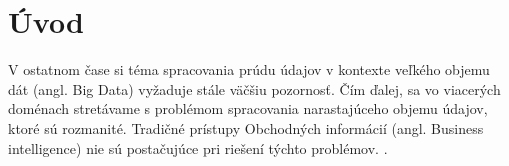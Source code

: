 %

\chapter{Úvod}
V ostatnom čase si téma spracovania prúdu údajov v kontexte veľkého objemu dát (angl. Big Data) vyžaduje stále väčšiu pozornosť. Čím ďalej, sa vo viacerých doménach stretávame s problémom spracovania narastajúceho objemu údajov, ktoré sú rozmanité. Tradičné prístupy Obchodných informácií (angl. Business intelligence) nie sú postačujúce pri riešení týchto problémov. \citep{liu2014survey}.\par

